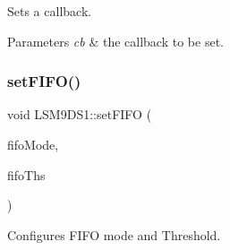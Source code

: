 Sets a callback. 


\begin{DoxyParams}{Parameters}
{\em cb} & the callback to be set. \\
\hline
\end{DoxyParams}
\mbox{\label{classLSM9DS1_a0ec4a93a34545af1acc336bae9b360f1}} 
\subsubsection{\texorpdfstring{set\+F\+I\+F\+O()}{setFIFO()}}
{\footnotesize\ttfamily void L\+S\+M9\+D\+S1\+::set\+F\+I\+FO (\begin{DoxyParamCaption}\item[{fifo\+Mode\+\_\+type}]{fifo\+Mode,  }\item[{uint8\+\_\+t}]{fifo\+Ths }\end{DoxyParamCaption})}



Configures F\+I\+FO mode and Threshold. 


